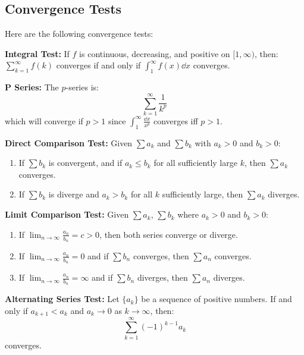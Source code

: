 \documentclass{article}
\begin{document}
    \subsection{Convergence Tests}
    Here are the following convergence tests:
    \begin{theorem}
        \textbf{Integral Test:} If $f$ is continuous, decreasing, and positive on $[1,\infty)$, then: $\sum_{k=1}^\infty f(k)$ converges if and only if $\int_1^\infty f(x) \dd{x}$ converges.
    \end{theorem}
    \begin{theorem}
        \textbf{P Series:} The $p$-series is:
        \begin{equation}
            \sum_{k=1}^\infty \frac{1}{k^p}
        \end{equation}
        which will converge if $p > 1$ since $\int_1^\infty \frac{\dd{x}}{x^p}$ converges iff $p>1$.
    \end{theorem}
    \begin{theorem}
        \textbf{Direct Comparison Test:} Given $\sum a_k$ and $\sum b_k$ with $a_k > 0 $ and $b_k > 0$:
        \begin{enumerate}
            \item If $\sum b_k$ is convergent, and if $a_k \le b_k$ for all sufficiently large $k$, then $\sum a_k$ converges.
            \item If $\sum b_k$ is diverge and $a_k > b_k$ for all $k$ sufficiently large, then $\sum a_k$ diverges.
        \end{enumerate}
    \end{theorem}
    \begin{theorem}
        \textbf{Limit Comparison Test:} Given $\sum a_k$, $\sum b_k$ where $a_k > 0 $ and $b_k > 0$:
        \begin{enumerate}
            \item If $\lim_{n\to\infty} \frac{a_n}{b_n} = c > 0$, then both series converge or diverge.
            \item If $\lim_{n\to\infty} \frac{a_n}{b_n} = 0$ and if $\sum b_{n}$ converges, then $\sum {a_n}$ converges.
            \item If $\lim_{n\to\infty} \frac{a_n}{b_n} = \infty$ and if $\sum b_n$ diverges, then $\sum a_n$ diverges.
        \end{enumerate}
    \end{theorem}
    \begin{theorem}
        \textbf{Alternating Series Test:} Let $\{a_k\}$ be a sequence of positive numbers. If and only if $a_{k+1}<a_k$ and $a_k \to 0$ as $k \to \infty$, then:
        \begin{equation}
            \sum_{k=1}^\infty (-1)^{k-1} a_k
        \end{equation}
        converges.
    \end{theorem}
\end{document}
